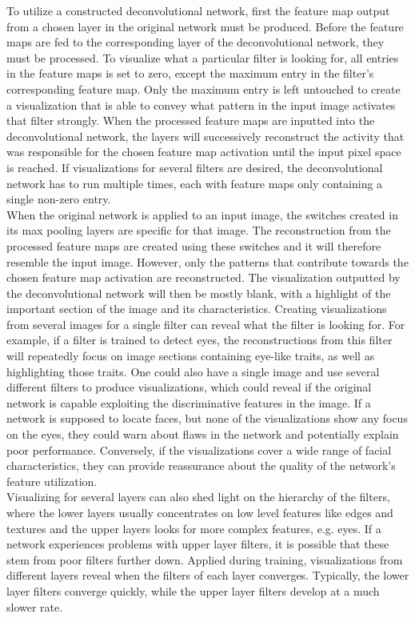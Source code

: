 \noindent To utilize a constructed deconvolutional network, first the feature map output from a chosen layer in the original network must be produced. Before the feature maps are fed to the corresponding layer of the deconvolutional network, they must be processed. To visualize what a particular filter is looking for, all entries in the feature maps is set to zero, except the maximum entry in the filter's corresponding feature map. Only the maximum entry is left untouched to create a visualization that is able to convey what pattern in the input image activates that filter strongly. When the processed feature maps are inputted into the deconvolutional network, the layers will successively reconstruct the activity that was responsible for the chosen feature map activation until the input pixel space is reached. If visualizations for several filters are desired, the deconvolutional network has to run multiple times, each with feature maps only containing a single non-zero entry. \\

\noindent When the original network is applied to an input image, the switches created in its max pooling layers are specific for that image. The reconstruction from the processed feature maps are created using these switches and it will therefore resemble the input image. However, only the patterns that contribute towards the chosen feature map activation are reconstructed. The visualization outputted by the deconvolutional network will then be mostly blank, with a highlight of the important section of the image and its characteristics. Creating visualizations from several images for a single filter can reveal what the filter is looking for. For example, if a filter is trained to detect eyes, the reconstructions from this filter will repeatedly focus on image sections containing eye-like traits, as well as highlighting those traits. One could also have a single image and use several different filters to produce visualizations, which could reveal if the original network is capable exploiting the discriminative features in the image. If a network is supposed to locate faces, but none of the visualizations show any focus on the eyes, they could warn about flaws in the network and potentially explain poor performance. Conversely, if the visualizations cover a wide range of facial characteristics, they can provide reassurance about the quality of the network's feature utilization. \\

\noindent Visualizing for several layers can also shed light on the hierarchy of the filters, where the lower layers usually concentrates on low level features like edges and textures and the upper layers looks for more complex features, e.g. eyes. If a network experiences problems with upper layer filters, it is possible that these stem from poor filters further down. Applied during training, visualizations from different layers reveal when the filters of each layer converges. Typically, the lower layer filters converge quickly, while the upper layer filters develop at a much slower rate.


